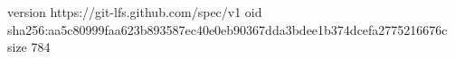 version https://git-lfs.github.com/spec/v1
oid sha256:aa5c80999faa623b893587ec40e0eb90367dda3bdee1b374dcefa2775216676c
size 784
